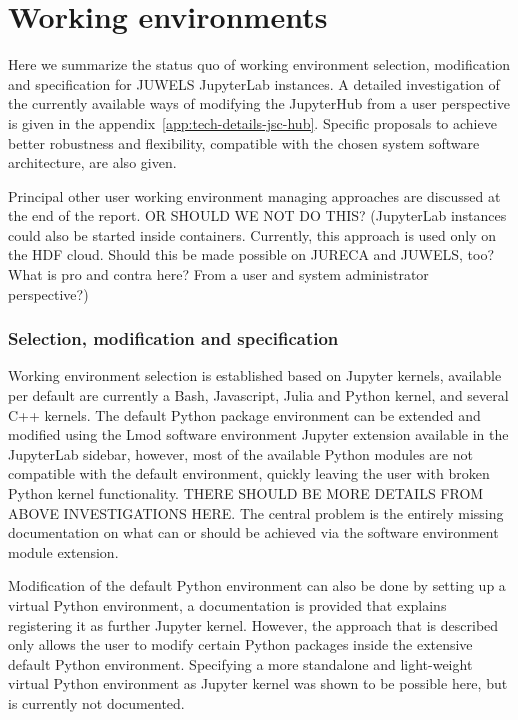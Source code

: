 
\section{Working environments}

Here we summarize the status quo of working environment selection, modification and specification for JUWELS JupyterLab instances.
A detailed investigation of the currently available ways of modifying the JupyterHub from a user perspective is given in the appendix~\ref{app:tech-details-jsc-hub}.
Specific proposals to achieve better robustness and flexibility, compatible with the chosen system software architecture, are also given.

Principal other user working environment managing approaches are discussed at the end of the report. OR SHOULD WE NOT DO THIS? (JupyterLab instances could also be started inside containers. Currently, this approach is used only on the HDF cloud. Should this be made possible on JURECA and JUWELS, too? What is pro and contra here? From a user and system administrator perspective?)

\subsubsection{Selection, modification and specification}

Working environment selection is established based on Jupyter kernels, available per default are currently a Bash, Javascript, Julia and Python kernel, and several C++ kernels.
The default Python package environment can be extended and modified using the Lmod software environment Jupyter extension available in the JupyterLab sidebar, however, most of the available Python modules are not compatible with the default environment, quickly leaving the user with broken Python kernel functionality.
THERE SHOULD BE MORE DETAILS FROM ABOVE INVESTIGATIONS HERE.
The central problem is the entirely missing documentation on what can or should be achieved via the software environment module extension.

Modification of the default Python environment can also be done by setting up a virtual Python environment, a documentation is provided that explains registering it as further Jupyter kernel.
However, the approach that is described only allows the user to modify certain Python packages inside the extensive default Python environment.
Specifying a more standalone and light-weight virtual Python environment as Jupyter kernel was shown to be possible here, but is currently not documented.

